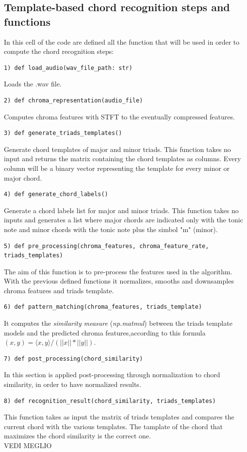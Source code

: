 \documentclass[
	12pt, %
]{fphw}
\begin{document}
\subsection{Template-based chord recognition steps and functions}
In this cell of the code are defined all the function that will be used in order to compute the chord recognition steps:
\begin{lstlisting}
1) def load_audio(wav_file_path: str)
\end{lstlisting}
Loads the .wav file.
\begin{lstlisting}
2) def chroma_representation(audio_file)
\end{lstlisting}
Computes chroma features with STFT to the eventually compressed features.
\begin{lstlisting}
3) def generate_triads_templates()
\end{lstlisting}
Generate chord templates of major and minor triads. This function takes no input and returns the matrix containing the chord templates as columns.
Every column will be a binary vector representing the template for every minor or major chord.
\begin{lstlisting}
4) def generate_chord_labels()
\end{lstlisting}
Generate a chord labels list for major and minor triads.
This function takes no inputs and generates a list where major chords are indicated only with the tonic note and minor chords with the tonic note plus the simbol "m" (minor).
\begin{lstlisting}
5) def pre_processing(chroma_features, chroma_feature_rate, triads_templates)
\end{lstlisting}
The aim of this function is to pre-process the features used in the algorithm.
With the previous defined functions it normalizes, smooths and downsamples chroma features and triads template.
\begin{lstlisting}
6) def pattern_matching(chroma_features, triads_template)
\end{lstlisting}
It computes the \textit{similarity measure} (\textit{np.matmul}) between the triads template models and the predicted chroma features,according to this formula $(x,y)=\langle x,y\rangle/(||x||*||y||)$.

\begin{lstlisting}
7) def post_processing(chord_similarity)
\end{lstlisting}
In this section is applied post-processing through normalization to chord similarity, in order to have normalized results.
\begin{lstlisting}
8) def recognition_result(chord_similarity, triads_templates)
\end{lstlisting}
This function takes as input the matrix of triads templates and compares the current chord with the various templates. The tamplate of the chord that maximizes the chord similarity is the correct one.\\
VEDI MEGLIO
\end{document}
